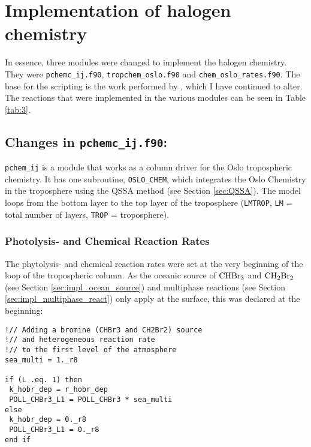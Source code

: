 


\section{Implementation of halogen chemistry}

In essence, three modules were changed to implement the halogen chemistry. They were \texttt{pchemc\_ij.f90}, \texttt{tropchem\_oslo.f90} and \texttt{chem\_oslo\_rates.f90}. The base for the scripting is the work performed by \cite{Susanne}, which I have continued to alter.  The reactions that were implemented in the various modules can be seen in Table \ref{tab:3}.





\subsection{Changes in \texttt{pchemc\_ij.f90}:}

\texttt{pchem\_ij} is a module that works as a column driver for the Oslo tropospheric chemistry. It has one subroutine, \texttt{OSLO\_CHEM}, which integrates the Oslo Chemistry in the troposphere using the QSSA method (see Section \ref{sec:QSSA}). The model loops from the bottom layer to the top layer of the troposphere (\texttt{LMTROP}, \texttt{LM} = total number of layers, \texttt{TROP} = troposphere). 

\subsubsection{Photolysis- and Chemical Reaction Rates}

The phytolysis- and chemical reaction rates were set at the very beginning of the loop of the tropospheric column. As the oceanic source of $\mathrm{CHBr_3}$ and $\mathrm{CH_2Br_2}$ (see Section \ref{sec:impl_ocean_source}) and multiphase reactions (see Section \ref{sec:impl_multiphase_react}) only apply at the surface, this was declared at the beginning:

\begin{lstlisting}
!// Adding a bromine (CHBr3 and CH2Br2) source 
!// and heterogeneous reaction rate 
!// to the first level of the atmosphere
sea_multi = 1._r8

if (L .eq. 1) then
 k_hobr_dep = r_hobr_dep
 POLL_CHBr3_L1 = POLL_CHBr3 * sea_multi
else
 k_hobr_dep = 0._r8
 POLL_CHBr3_L1 = 0._r8
end if
\end{lstlisting}


